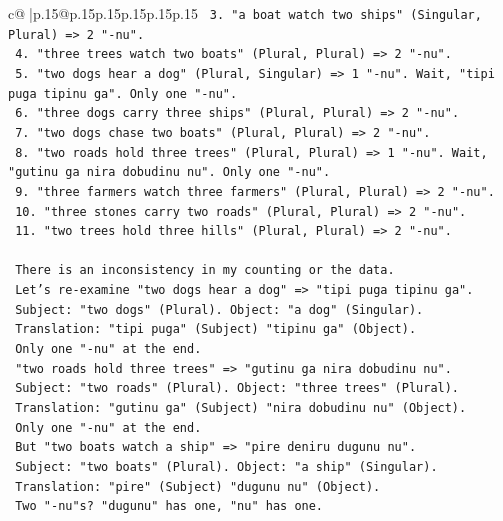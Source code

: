 \documentclass{article}
\begin{document}
{\begin{supertabular}{c@{$\;$}|p{.15\linewidth}@{}p{.15\linewidth}p{.15\linewidth}p{.15\linewidth}p{.15\linewidth}p{.15\linewidth}}
{{{\texttt{   3. "a boat watch two ships" (Singular, Plural) => 2 "{-}nu".} \\
\texttt{   4. "three trees watch two boats" (Plural, Plural) => 2 "{-}nu".} \\
\texttt{   5. "two dogs hear a dog" (Plural, Singular) => 1 "{-}nu". Wait, "tipi puga tipinu ga". Only one "{-}nu".} \\
\texttt{   6. "three dogs carry three ships" (Plural, Plural) => 2 "{-}nu".} \\
\texttt{   7. "two dogs chase two boats" (Plural, Plural) => 2 "{-}nu".} \\
\texttt{   8. "two roads hold three trees" (Plural, Plural) => 1 "{-}nu". Wait, "gutinu ga nira dobudinu nu". Only one "{-}nu".} \\
\texttt{   9. "three farmers watch three farmers" (Plural, Plural) => 2 "{-}nu".} \\
\texttt{   10. "three stones carry two roads" (Plural, Plural) => 2 "{-}nu".} \\
\texttt{   11. "two trees hold three hills" (Plural, Plural) => 2 "{-}nu".} \\
\\ 
\texttt{   There is an inconsistency in my counting or the data.} \\
\texttt{   Let's re{-}examine "two dogs hear a dog" => "tipi puga tipinu ga".} \\
\texttt{   Subject: "two dogs" (Plural). Object: "a dog" (Singular).} \\
\texttt{   Translation: "tipi puga" (Subject) "tipinu ga" (Object).} \\
\texttt{   Only one "{-}nu" at the end.} \\
\texttt{   "two roads hold three trees" => "gutinu ga nira dobudinu nu".} \\
\texttt{   Subject: "two roads" (Plural). Object: "three trees" (Plural).} \\
\texttt{   Translation: "gutinu ga" (Subject) "nira dobudinu nu" (Object).} \\
\texttt{   Only one "{-}nu" at the end.} \\
\texttt{   But "two boats watch a ship" => "pire deniru dugunu nu".} \\
\texttt{   Subject: "two boats" (Plural). Object: "a ship" (Singular).} \\
\texttt{   Translation: "pire" (Subject) "dugunu nu" (Object).} \\
\texttt{   Two "{-}nu"s? "dugunu" has one, "nu" has one.} \\
}}}
\end{supertabular}}
\end{document}
